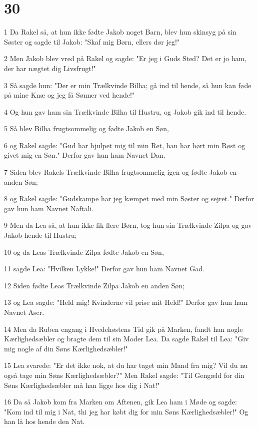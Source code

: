 \chapter{30}

\par 1 Da Rakel så, at hun ikke fødte Jakob noget Barn, blev hun skinsyg på sin Søster og sagde til Jakob: "Skaf mig Børn, ellers dør jeg!"
\par 2 Men Jakob blev vred på Rakel og sagde: "Er jeg i Guds Sted? Det er jo ham, der har nægtet dig Livsfrugt!"
\par 3 Så sagde hun: "Der er min Trælkvinde Bilha; gå ind til hende, så hun kan føde på mine Knæ og jeg få Sønner ved hende!"
\par 4 Og hun gav ham sin Trælkvinde Bilha til Hustru, og Jakob gik ind til hende.
\par 5 Så blev Bilha frugtsommelig og fødte Jakob en Søn,
\par 6 og Rakel sagde: "Gud har hjulpet mig til min Ret, han har hørt min Røst og givet mig en Søn." Derfor gav hun ham Navnet Dan.
\par 7 Siden blev Rakels Trælkvinde Bilha frugtsommelig igen og fødte Jakob en anden Søn;
\par 8 og Rakel sagde: "Gudskampe har jeg kæmpet med min Søster og sejret." Derfor gav hun ham Navnet Naftali.
\par 9 Men da Lea så, at hun ikke fik flere Børn, tog hun sin Trælkvinde Zilpa og gav Jakob hende til Hustru;
\par 10 og da Leas Trælkvinde Zilpa fødte Jakob en Søn,
\par 11 sagde Lea: "Hvilken Lykke!" Derfor gav hun ham Navnet Gad.
\par 12 Siden fødte Leas Trælkvinde Zilpa Jakob en anden Søn;
\par 13 og Lea sagde: "Held mig! Kvinderne vil prise mit Held!" Derfor gav hun ham Navnet Aser.
\par 14 Men da Ruben engang i Hvedehøstens Tid gik på Marken, fandt han nogle Kærlighedsæbler og bragte dem til sin Moder Lea. Da sagde Rakel til Lea: "Giv mig nogle af din Søns Kærlighedsæbler!"
\par 15 Lea svarede: "Er det ikke nok, at du har taget min Mand fra mig? Vil du nu også tage min Søns Kærlighedsæbler?" Men Rakel sagde: "Til Gengæld for din Søns Kærlighedsæbler må han ligge hos dig i Nat!"
\par 16 Da så Jakob kom fra Marken om Aftenen, gik Lea ham i Møde og sagde: "Kom ind til mig i Nat, thi jeg har købt dig for min Søns Kærlighedsæbler!" Og han lå hos hende den Nat.
